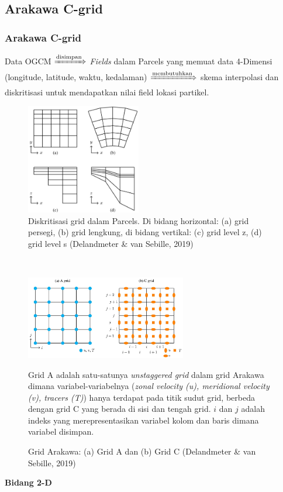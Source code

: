 \documentclass{beamer}
\begin{document}
\subsection{Arakawa C-grid}
\begin{frame}[allowframebreaks]
	\frametitle{Arakawa C-grid}	
	\;
	Data OGCM $\xRightarrow{\text{disimpan}}$ \textit{Fields} dalam Parcels yang memuat data 4-Dimensi (longitude, latitude, waktu,  kedalaman) $\xRightarrow{\text{membutuhkan}}$ skema interpolasi dan diskritisasi untuk mendapatkan nilai field
	lokasi partikel.
	\begin{figure}[H]
	\centering
	\includegraphics[width=5cm]{grid.jpg}
	\caption{Diskritisasi grid dalam Parcels. Di bidang horizontal: (a) grid persegi, (b) grid lengkung, di bidang vertikal: (c) grid level z, (d) grid level s (Delandmeter \& van Sebille, 2019)}
	\label{fig:grid}
	\end{figure}
	$\;$ \\
	\begin{figure}[H]
		\centering
		\includegraphics[width=7cm]{arakawa.jpg}
		\caption{Grid Arakawa: (a) Grid A dan (b) Grid C (Delandmeter \& van Sebille, 2019)}
			\label{fig:arakawa}
			\tiny
			Grid A adalah satu-satunya \textit{unstaggered grid} dalam grid Arakawa dimana variabel-variabelnya (\textit{zonal velocity (u), meridional velocity (v), tracers (T)}) hanya terdapat pada titik sudut grid, berbeda dengan grid C yang berada di sisi dan tengah grid. $i$ dan $j$ adalah indeks yang merepresentasikan variabel kolom dan baris dimana variabel disimpan.
	\end{figure}
	\newpage
	\textbf{\large Bidang 2-D} \\

\end{frame}
\end{document}

